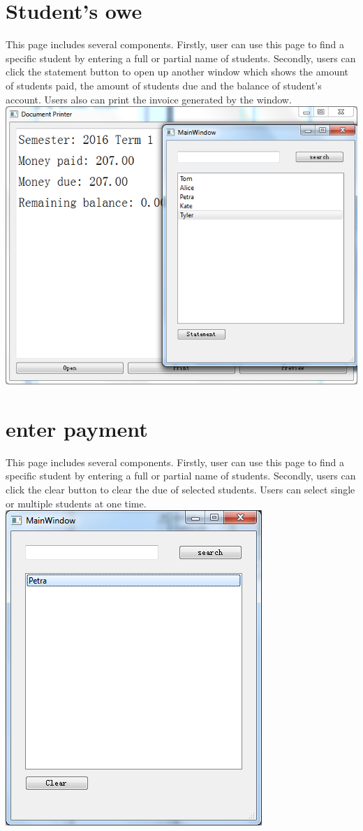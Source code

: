 \documentclass[11pt]{book}
\begin{document}
\section{Student's owe}
This page includes several components. Firstly, user can use this page to find a specific student by entering a full or partial name of students. Secondly, users can click the statement button to open up another window which shows the amount of students paid, the amount of students due and the balance of student's account. Users also can print the invoice generated by the window.\\
\includegraphics[scale=0.5]{invoice.png}

\section{enter payment}
This page includes several components. Firstly, user can use this page to find a specific student by entering a full or partial name of students. Secondly, users can click the clear button to clear the due of selected students. Users can select single or multiple students at one time.\\
\includegraphics[scale=0.5]{enterPayment.png}
\end{document}
